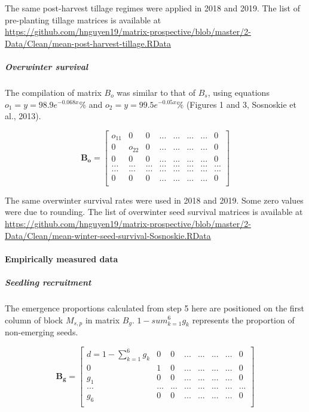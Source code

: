 \documentclass[
]{article}
\begin{document}
The same post-harvest tillage regimes were applied in 2018 and 2019. The list of pre-planting tillage matrices is available at \url{https://github.com/hnguyen19/matrix-prospective/blob/master/2-Data/Clean/mean-post-harvest-tillage.RData}

\hypertarget{overwinter-survival}{%
\subparagraph*{Overwinter survival}\label{overwinter-survival}}

The compilation of matrix \(B_o\) was similar to that of \(B_s\), using equations \(o_1 = y = 98.9 e^{-0.068x} \%\) and \(o_2 = y = 99.5 e^{-0.05x} \%\) (Figures 1 and 3, Sosnoskie et al., 2013).

\[
\mathbf{B_o} = \left[\begin{array}
{rr|rrrrr} 
o_{11} & 0 & 0 & ... & ... & ... & ... & 0\\
0  & o_{22} & 0 & ... & ... & ... & ... & 0\\
\hline    
0 & 0 & 0 & ... & ... & ... & ... & 0 \\
... & ... & ... & ... & ... & ... & ... & ...\\ 
... & ... & ... & ... & ... & ... & ... & ...\\ 
0 & 0 & 0 & ... & ... & ... & ... & 0\\
\end{array}\right]
\]

The same overwinter survival rates were used in 2018 and 2019. Some zero values were due to rounding. The list of overwinter seed survival matrices is available at \url{https://github.com/hnguyen19/matrix-prospective/blob/master/2-Data/Clean/mean-winter-seed-survival-Sosnoskie.RData}

\hypertarget{empirically-measured-data}{%
\paragraph*{Empirically measured data}\label{empirically-measured-data}}

\hypertarget{seedling-recruitment}{%
\subparagraph*{Seedling recruitment}\label{seedling-recruitment}}

The emergence proportions calculated from step 5 here are positioned on the first column of block \(M_{s,p}\) in matrix \(B_g\). \(1 - sum_{k=1}^6 g_k\) represents the proportion of non-emerging seeds.

\[
\mathbf{B_g}=\left[\begin{array}
{rr|rrrrr} 
d = 1-\sum_{k=1}^6 g_k & 0 & 0 & ... & ... & ... & ... & 0\\  
0 & 1 & 0 & ... & ... & ... & ... & 0\\  
\hline             
g_1 & 0 & 0 & ... & ... & ... & ... & 0\\  
... & ... & ... & ... & ... & ... & ... & ...\\  
g_6 & 0 & 0 & ... & ... & ... & ... & 0\\  
\end{array}\right]
\]
\end{document}
